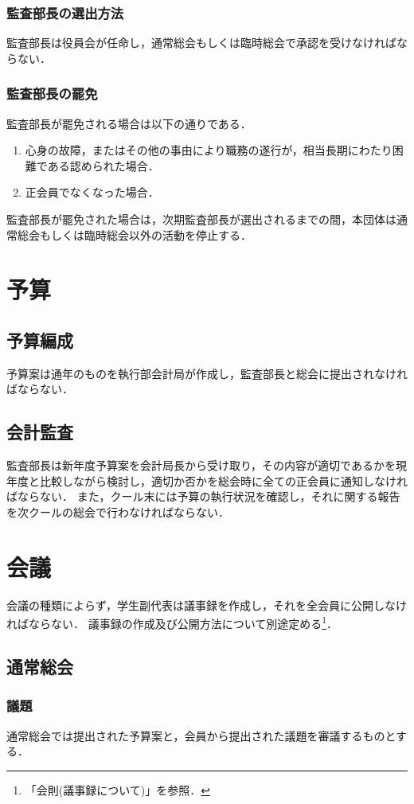 \documentclass{ltjsarticle}
\begin{document}
      \subsubsection{監査部長の選出方法}
        \jor
        監査部長は役員会が任命し，通常総会もしくは臨時総会で承認を受けなければならない．
      \subsubsection{監査部長の罷免}
        \jor
        監査部長が罷免される場合は以下の通りである．
        \begin{enumerate}
          \item 心身の故障，またはその他の事由により職務の遂行が，相当長期にわたり困難である認められた場合．
          \item 正会員でなくなった場合．
        \end{enumerate}
        監査部長が罷免された場合は，次期監査部長が選出されるまでの間，本団体は通常総会もしくは臨時総会以外の活動を停止する．
  \section{予算}
    \subsection{予算編成}
      \jor
      予算案は通年のものを執行部会計局が作成し，監査部長と総会に提出されなければならない．
    \subsection{会計監査}
      \jor
      監査部長は新年度予算案を会計局長から受け取り，その内容が適切であるかを現年度と比較しながら検討し，適切か否かを総会時に全ての正会員に通知しなければならない．
      また，クール末には予算の執行状況を確認し，それに関する報告を次クールの総会で行わなければならない．
  \section{会議}
    \jor
    会議の種類によらず，学生副代表は議事録を作成し，それを全会員に公開しなければならない．
    議事録の作成及び公開方法について別途定める\footnote{「会則(議事録について)」を参照．}．
    \subsection{通常総会}\label{sconf}
      \subsubsection{議題}
        \jor
        通常総会では提出された予算案と，会員から提出された議題を審議するものとする．
\end{document}
